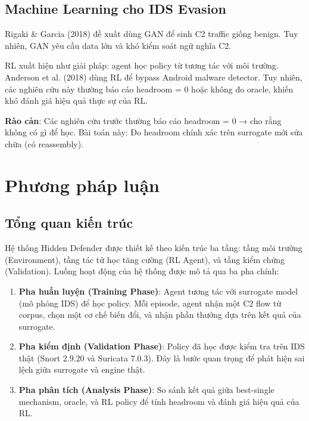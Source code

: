 \documentclass[12pt, a4paper, openany]{book}
\begin{document}
\section{Machine Learning cho IDS Evasion}

Rigaki \& Garcia (2018) đề xuất dùng GAN để sinh C2 traffic giống benign. Tuy nhiên, GAN yêu cầu data lớn và khó kiểm soát ngữ nghĩa C2.

RL xuất hiện như giải pháp: agent học policy từ tương tác với môi trường. Anderson et al. (2018) dùng RL để bypass Android malware detector. Tuy nhiên, các nghiên cứu này thường báo cáo headroom = 0 hoặc không đo oracle, khiến khó đánh giá hiệu quả thực sự của RL.

\textbf{Rào cản}: Các nghiên cứu trước thường báo cáo headroom = 0 → cho rằng không có gì để học. Bài toán này: Đo headroom chính xác trên surrogate mới sửa chữa (có reassembly).

\chapter{Phương pháp luận}

\section{Tổng quan kiến trúc}

Hệ thống Hidden Defender được thiết kế theo kiến trúc ba tầng: tầng môi trường (Environment), tầng tác tử học tăng cường (RL Agent), và tầng kiểm chứng (Validation). Luồng hoạt động của hệ thống được mô tả qua ba pha chính:

\begin{enumerate}
    \item \textbf{Pha huấn luyện (Training Phase)}: Agent tương tác với surrogate model (mô phỏng IDS) để học policy. Mỗi episode, agent nhận một C2 flow từ corpus, chọn một cơ chế biến đổi, và nhận phần thưởng dựa trên kết quả của surrogate.
    
    \item \textbf{Pha kiểm định (Validation Phase)}: Policy đã học được kiểm tra trên IDS thật (Snort 2.9.20 và Suricata 7.0.3). Đây là bước quan trọng để phát hiện sai lệch giữa surrogate và engine thật.
    
    \item \textbf{Pha phân tích (Analysis Phase)}: So sánh kết quả giữa best-single mechanism, oracle, và RL policy để tính headroom và đánh giá hiệu quả của RL.
\end{enumerate}
\end{document}
